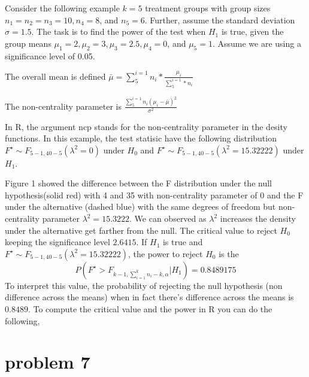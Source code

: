 \documentclass{article}
\begin{document}
Consider the following example $k = 5$ treatment groups with group sizes $n_1 = n_2 = n_3 = 10, n_4 = 8$,
and $n_5 = 6$. Further, assume the standard deviation $\sigma = 1.5$. The task is to find the power of the
test when $H_1$ is true, given the group means $\mu_1 = 2, \mu_2 = 3, \mu_3 = 2.5, \mu_4 = 0$, and $\mu_5 = 1$. Assume
we are using a significance level of 0.05.

The overall mean is defined $\bar{\mu}= \sum_{5}^{i=1}n_i*\frac{\mu_i}{\sum_{5}^{i=1}*n_i}$

The non-centrality parameter is $\frac{\sum_{5}^{i=1}n_i(\mu_i-\bar{\mu})^2}{\sigma^2}$

In R, the argument ncp stands for the non-centrality parameter in the desity functions. In this example, the test statisic
have the following distribution $F^\star \sim F_{5-1,40-5}(\lambda^2=0)$ under $H_0$ and $F^\star \sim F_{5-1,40-5}(\lambda^2 = 15.32222)$ under $H_1$.

Figure 1 showed the difference between the F distribution under the null hypothesis(solid red) with
4 and 35 with non-centrality parameter of 0 and the F under the alternative (dashed blue) with
the same degrees of freedom but non-centrality parameter $\lambda^2 = 15.3222$. We can observed as $\lambda^2$
increases the density under the alternative get farther from the null. The critical value to reject $H_0$
keeping the significance level $2.6415$. If $H_1$ is true and $F^\star \sim F_{5-1,40-5}(\lambda^2 = 15.32222)$, the power
to reject $H_0$ is the
$$
	P(F^\star>F_{k-1,\sum_{i=1}^{k}n_i-k,\alpha}|H_1)=0.8489175
$$
To interpret this value, the probability of rejecting the null hypothesis (non difference across the
means) when in fact there’s difference across the means is $0.8489$. To compute the critical value
and the power in R you can do the following,


\section{problem 7}
\end{document}
